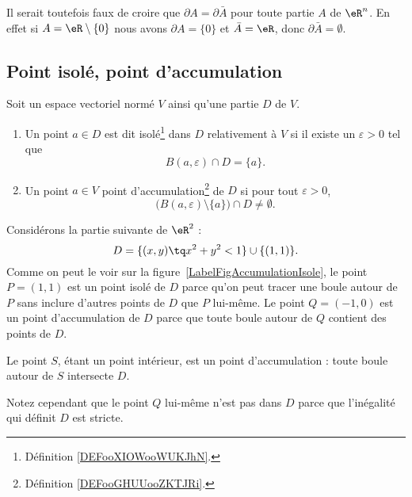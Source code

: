 \begin{remark}
	Il serait toutefois faux de croire que \( \partial A=\partial \bar A\) pour toute partie \( A\) de \( \eR^n\). En effet si \( A=\eR\setminus\{ 0 \}\) nous avons \( \partial A=\{ 0 \}\) et \( \bar A=\eR\), donc \( \partial \bar A=\emptyset\).
\end{remark}

\subsection{Point isolé, point d'accumulation}

\begin{lemma}       \label{LEMooOMVNooVBlQMD}
	Soit un espace vectoriel normé \( V\) ainsi qu'une partie \( D\) de \( V\).
	\begin{enumerate}
		\item
		      Un point $a\in D$ est dit isolé\footnote{Définition \ref{DEFooXIOWooWUKJhN}.} dans $D$ relativement à $V$ si il existe un $\varepsilon>0$ tel que
		      \begin{equation}
			      B(a,\varepsilon)\cap D=\{ a \}.
		      \end{equation}
		\item
		      Un point $a\in V$ point d'accumulation\footnote{Définition \ref{DEFooGHUUooZKTJRi}.} de $D$ si pour tout $\varepsilon>0$,
		      \begin{equation}
			      \Big( B(a,\varepsilon)\setminus\{ a \}\Big)\cap D\neq \emptyset.
		      \end{equation}
	\end{enumerate}
\end{lemma}

\newcommand{\CaptionFigAccumulationIsole}{L'ensemble décrit par l'équation \eqref{Eq2807BouleIso}. Le point $P$ est un point isolé de $D$, tandis que  les points $S$ et $Q$ sont des points d'accumulation.}


\begin{example}
	Considérons la partie suivante de $\eR^2$ :
	\begin{equation}	\label{Eq2807BouleIso}
		D=\{ (x,y)\tq x^2+y^2<1\}\cup\{ (1,1) \}.
	\end{equation}
	Comme on peut le voir sur la figure~\ref{LabelFigAccumulationIsole}, le point $P=(1,1)$ est un point isolé de $D$ parce qu'on peut tracer une boule autour de $P$ sans inclure d'autres points de $D$ que $P$ lui-même. Le point $Q=(-1,0)$ est un point d'accumulation de $D$ parce que toute boule autour de $Q$ contient des points de $D$.

	Le point $S$, étant un point intérieur, est un point d'accumulation : toute boule autour de $S$ intersecte $D$.

	Notez cependant que le point $Q$ lui-même n'est pas dans $D$ parce que l'inégalité qui définit $D$ est stricte.
\end{example}

